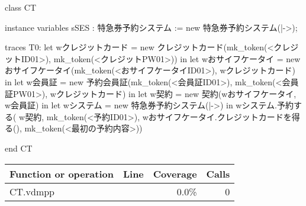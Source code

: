 \begin{vdmpp}[breaklines=true]
class CT

instance variables
sSES : 特急券予約システム := new 特急券予約システム({|->});

traces
T0:
 let wクレジットカード = new クレジットカード(mk_token(<クレジットID01>), mk_token(<クレジットPW01>)) in
 let wおサイフケータイ = new おサイフケータイ(mk_token(<おサイフケータイID01>), wクレジットカード) in
 let w会員証 = new 予約会員証(mk_token(<会員証ID01>), mk_token(<会員証PW01>), wクレジットカード) in
 let w契約 = new 契約(wおサイフケータイ, w会員証) in
 let wシステム = new 特急券予約システム({|->}) in
 wシステム.予約する( w契約, mk_token(<予約ID01>),  wおサイフケータイ.クレジットカードを得る(), mk_token(<最初の予約内容>)) 


end CT
\end{vdmpp}
\bigskip
\begin{longtable}{|l|r|r|r|}
\hline
Function or operation & Line & Coverage & Calls \\
\hline
\hline
\hline
CT.vdmpp & & 0.0\% & 0 \\
\hline
\end{longtable}

